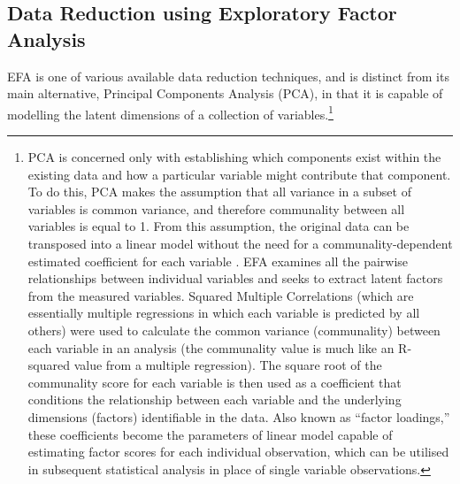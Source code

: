 \subsection{\label{app5:EFA}Data Reduction using Exploratory Factor Analysis}
EFA is one of various available data reduction techniques, and is distinct from its main alternative, Principal Components Analysis (PCA), in that it is capable of modelling the latent dimensions of a collection of variables.\footnote{PCA is concerned only with establishing which components exist within the existing data and how a particular variable might contribute that component. To do this, PCA makes the assumption that all variance in a subset of variables is common variance, and therefore communality between all variables is equal to 1. From this assumption, the original data can be transposed into a linear model without the need for a communality-dependent estimated coefficient for each variable \citep{Widaman2007}. EFA examines all the pairwise relationships between individual variables and seeks to extract latent factors from the measured variables.  Squared Multiple Correlations (which are essentially multiple regressions in which each variable is predicted by all others) were used to calculate the common variance (communality) between each variable in an analysis (the communality value is much like an R-squared value from a multiple regression).
The square root of the communality score for each variable is then used as a coefficient that conditions the relationship between each variable and the underlying dimensions (factors) identifiable in the data. Also known as ``factor loadings,'' these coefficients become the parameters of linear model capable of estimating factor scores for each individual observation, which can be utilised in subsequent statistical analysis in place of single variable observations.

}
